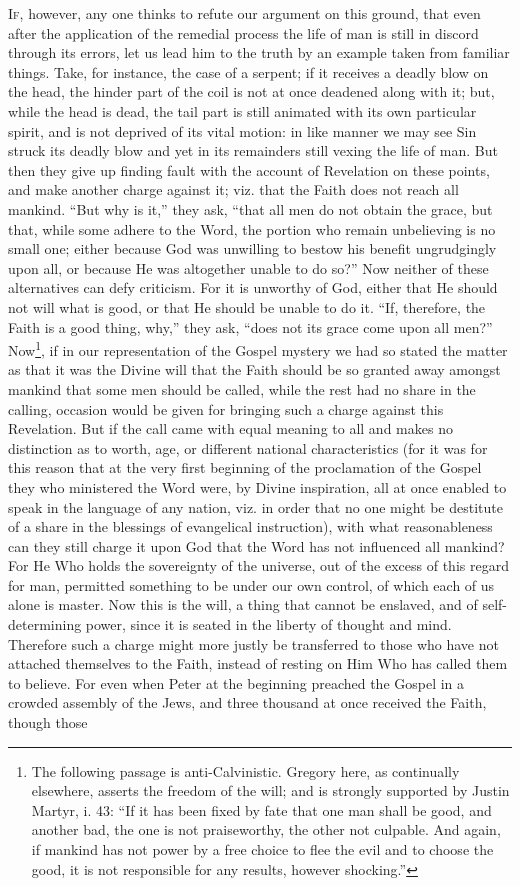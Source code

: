\textsc{If}, however, any one thinks to refute our argument on this ground, that even after the application of the remedial process the life of man is still in discord through its errors, let us lead him to the truth by an example taken from familiar things. Take, for instance, the case of a serpent; if it receives a deadly blow on the head, the hinder part of the coil is not at once deadened along with it; but, while the head is dead, the tail part is still animated with its own particular spirit, and is not deprived of its vital motion: in like manner we may see Sin struck its deadly blow and yet in its remainders still vexing the life of man. But then they give up finding fault with the account of Revelation on these points, and make another charge against it; viz. that the Faith does not reach all mankind. “But why is it,” they ask, “that all men do not obtain the grace, but that, while some adhere to the Word, the portion who remain unbelieving is no small one; either because God was unwilling to bestow his benefit ungrudgingly upon all, or because He was altogether unable to do so?” Now neither of these alternatives can defy criticism. For it is unworthy of God, either that He should not will what is good, or that He should be unable to do it. “If, therefore, the Faith is a good thing, why,” they ask, “does not its grace come upon all men?” Now\footnote{The following passage is anti-Calvinistic. Gregory here, as continually elsewhere, asserts the freedom of the will; and is strongly supported by Justin Martyr, i. 43: “If it has been fixed by fate that one man shall be good, and another bad, the one is not praiseworthy, the other not culpable. And again, if mankind has not power by a free choice to flee the evil and to choose the good, it is not responsible for any results, however shocking.”}, if in our representation of the Gospel mystery we had so stated the matter as that it was the Divine will that the Faith should be so granted away amongst mankind that some men should be called, while the rest had no share in the calling, occasion would be given for bringing such a charge against this Revelation. But if the call came with equal meaning to all and makes no distinction as to worth, age, or different national characteristics (for it was for this reason that at the very first beginning of the proclamation of the Gospel they who ministered the Word were, by Divine inspiration, all at once enabled to speak in the language of any nation, viz. in order that no one might be destitute of a share in the blessings of evangelical instruction), with what reasonableness can they still charge it upon God that the Word has not influenced all mankind? For He Who holds the sovereignty of the universe, out of the excess of this regard for man, permitted something to be under our own control, of which each of us alone is master. Now this is the will, a thing that cannot be enslaved, and of self-determining power, since it is seated in the liberty of thought and mind. Therefore such a charge might more justly be transferred to those who have not attached themselves to the Faith, instead of resting on Him Who has called them to believe. For even when Peter at the beginning preached the Gospel in a crowded assembly of the Jews, and three thousand at once received the Faith, though those 